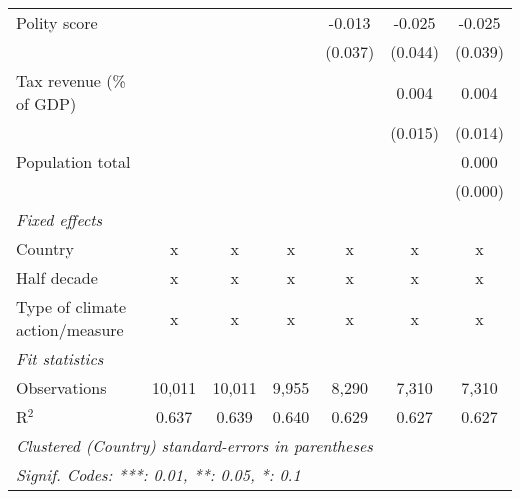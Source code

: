 \begin{tabular}{lcccccc}
   Polity score                                                             &              &               &               & -0.013       & -0.025       & -0.025\\   
                                                                            &              &               &               & (0.037)      & (0.044)      & (0.039)\\   
   Tax revenue (\% of GDP)                                                  &              &               &               &              & 0.004        & 0.004\\   
                                                                            &              &               &               &              & (0.015)      & (0.014)\\   
   Population total                                                         &              &               &               &              &              & 0.000\\   
                                                                            &              &               &               &              &              & (0.000)\\   
   \emph{Fixed effects}\\
   Country                                                                  & x            & x             & x             & x            & x            & x\\  
   Half decade                                                              & x            & x             & x             & x            & x            & x\\  
   Type of climate action/measure                                           & x            & x             & x             & x            & x            & x\\  
   \midrule \emph{Fit statistics}\\
   Observations                                                             & 10,011       & 10,011        & 9,955         & 8,290        & 7,310        & 7,310\\  
   R$^2$                                                                    & 0.637        & 0.639         & 0.640         & 0.629        & 0.627        & 0.627\\  
   \midrule
   \multicolumn{7}{l}{\emph{Clustered (Country) standard-errors in parentheses}}\\
   \multicolumn{7}{l}{\emph{Signif. Codes: ***: 0.01, **: 0.05, *: 0.1}}\\
\end{tabular}
\par\endgroup


